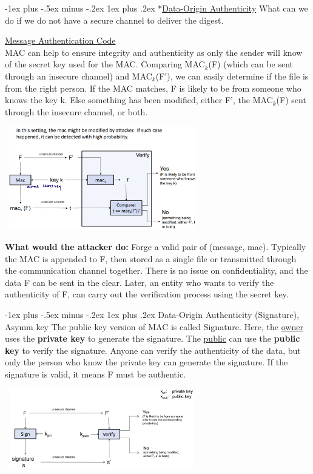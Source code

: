 \documentclass[10pt,landscape]{article}
\makeatletter
\renewcommand{\subsubsection}{\@startsection{subsubsection}{3}{0mm}%
                                {-1ex plus -.5ex minus -.2ex}%
                                {1ex plus .2ex}%
                                {\normalfont\small\bfseries}}
\makeatother
\begin{document}
\begin{multicols*}{3}
\subsubsection*{\underline{Data-Origin Authenticity}}
 What can we do if we do not have a secure channel to deliver the digest.

 \underline{Message Authentication Code} \\
 MAC can help to ensure integrity and authenticity as only the sender will know of the secret key used for the MAC.
 Comparing MAC$_k$(F) (which can be sent through an insecure channel) and MAC$_k$(F'), we can easily determine if 
 the file is from the right person. If the MAC matches, F is likely to be from someone who knows the key k. Else something 
 has been modified, either F', the MAC$_k$(F) sent through the insecure channel, or both.

 \includegraphics*[height=4.5cm, width=8.5cm]{images/macdiagram.png}


 \textbf{What would the attacker do:} Forge a valid pair of (message, mac). Typically the MAC is appended to F, then stored as a 
 single file or transmitted through the communication channel together. There is no issue on confidentiality, and the data F can be sent in the clear.
 Later, an entity who wants to verify the authenticity of F, can carry out the verification process using the secret key. 

\subsubsection{Data-Origin Authenticity (Signature), Asymm key}
The public key version of MAC is called Signature. Here, the \underline{owner} uses the \textbf{private key} to generate the
signature. The \underline{public} can use the \textbf{public key} to verify the signature.
Anyone can verify the authenticity of the data, but only the person who know the private key can generate the signature.
If the signature is valid, it means F must be authentic.

\includegraphics*[height=3.5cm, width=8.5cm]{images/signature.png}


\end{multicols*}
\end{document}
